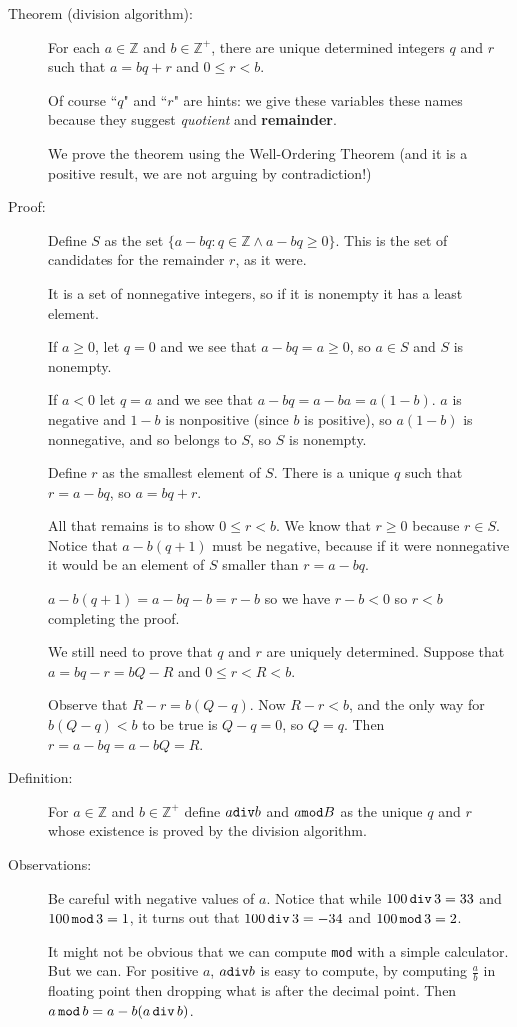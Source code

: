 \documentclass[12pt]{article}
\begin{document}
\begin{description}

\item[Theorem (division algorithm):]  For each $a \in {\mathbb Z}$ and $b \in {\mathbb Z}^+$, there are unique determined integers $q$ and $r$ such that $a=bq+r$ and $0 \leq r <b$.

Of course ``$q$" and ``$r$" are hints:  we give these variables these names because they suggest {\em quotient\/} and {\bf remainder\/}.

We prove the theorem using the Well-Ordering Theorem (and it is a positive result, we are not arguing by contradiction!)

\item[Proof:]

Define $S$ as the set $\{a-bq:q \in {\mathbb Z} \wedge a-bq\geq 0\}$.  This is the set of candidates for the remainder $r$, as it were.

It is a set of nonnegative integers, so if it is nonempty it has a least element.

If $a\geq 0$, let $q=0$ and we see that $a-bq=a\geq 0$, so $a \in S$ and $S$ is nonempty.

If $a <0$ let $q=a$ and we see that $a-bq = a-ba=a(1-b)$.  $a$ is negative and $1-b$ is nonpositive (since $b$ is positive), so $a(1-b)$ is nonnegative, and so belongs to $S$, so $S$ is nonempty.

Define $r$ as the smallest element of $S$.  There is a unique $q$ such that $r=a-bq$, so $a=bq+r$.

All that remains is to show $0 \leq r<b$.  We know that $r \geq 0$ because $r \in S$.  Notice that $a-b(q+1)$ must be negative, because
if it were nonnegative it would be an element of $S$ smaller than $r=a-bq$.

$a-b(q+1) = a-bq-b=r-b$ so we have $r-b<0$ so $r<b$ completing the proof.


We still need to prove that $q$ and $r$ are uniquely determined.  Suppose that $a=bq-r = bQ-R$ and $0\leq r < R <b$.

Observe that $R-r = b(Q-q)$.  Now $R-r<b$, and the only way for $b(Q-q)<b$ to be true is $Q-q=0$, so $Q=q$.  Then $r=a-bq = a-bQ = R$.

\item[Definition:]  For $a \in {\mathbb Z}$ and $b \in {\mathbb Z}^+$ define $a {\tt div} b$ and $a {\tt mod} B$ as the unique $q$ and $r$ whose existence is proved by the division algorithm.

\item[Observations:]  Be careful with negative values of $a$.  Notice that while $100 \,{\tt div}\, 3 = 33$ and $100\, {\tt mod}\, 3 = 1$, it turns out that 
$100\, {\tt div}\, 3 = -34$ and $100 \,{\tt mod} \,3 = 2$.

It might not be obvious that we can compute {\tt mod} with a simple calculator.  But we can.  For positive $a$, $a {\tt div} b$ is easy to compute, by computing $\frac ab$ in floating point then dropping what is after the decimal point.  Then $a\, {\tt mod}\, b=a - b(a\,{\tt div}\,b)$.


\end{description}
\end{document}
